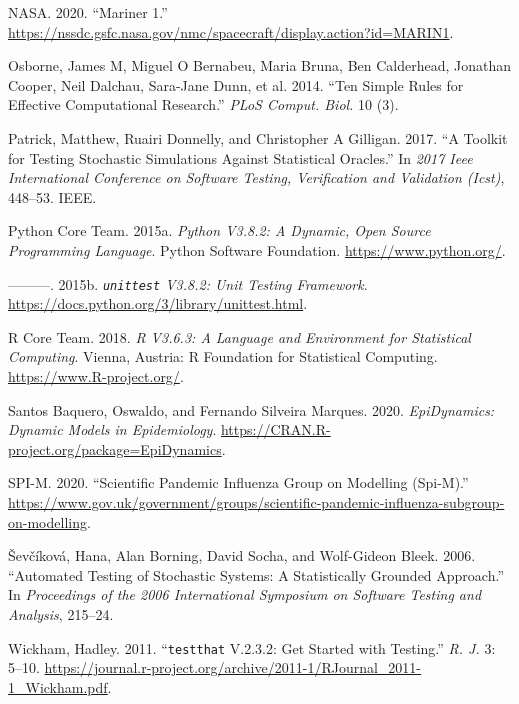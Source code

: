 \documentclass[]{elsarticle} %
\begin{document}
\leavevmode\hypertarget{ref-nasa}{}%
NASA. 2020. ``Mariner 1.'' \url{https://nssdc.gsfc.nasa.gov/nmc/spacecraft/display.action?id=MARIN1}.

\leavevmode\hypertarget{ref-osborne2014ten}{}%
Osborne, James M, Miguel O Bernabeu, Maria Bruna, Ben Calderhead, Jonathan Cooper, Neil Dalchau, Sara-Jane Dunn, et al. 2014. ``Ten Simple Rules for Effective Computational Research.'' \emph{PLoS Comput. Biol.} 10 (3).

\leavevmode\hypertarget{ref-patrick2017toolkit}{}%
Patrick, Matthew, Ruairi Donnelly, and Christopher A Gilligan. 2017. ``A Toolkit for Testing Stochastic Simulations Against Statistical Oracles.'' In \emph{2017 Ieee International Conference on Software Testing, Verification and Validation (Icst)}, 448--53. IEEE.

\leavevmode\hypertarget{ref-python}{}%
Python Core Team. 2015a. \emph{\textup{Python} V3.8.2: A Dynamic, Open Source Programming Language}. Python Software Foundation. \url{https://www.python.org/}.

\leavevmode\hypertarget{ref-pythonunittest}{}%
---------. 2015b. \emph{\texttt{unittest} V3.8.2: Unit Testing Framework}. \url{https://docs.python.org/3/library/unittest.html}.

\leavevmode\hypertarget{ref-R}{}%
R Core Team. 2018. \emph{\textup{R} V3.6.3: A Language and Environment for Statistical Computing}. Vienna, Austria: R Foundation for Statistical Computing. \url{https://www.R-project.org/}.

\leavevmode\hypertarget{ref-santos2015epidynamics}{}%
Santos Baquero, Oswaldo, and Fernando Silveira Marques. 2020. \emph{EpiDynamics: Dynamic Models in Epidemiology}. \url{https://CRAN.R-project.org/package=EpiDynamics}.

\leavevmode\hypertarget{ref-spim}{}%
SPI-M. 2020. ``Scientific Pandemic Influenza Group on Modelling (Spi-M).'' \url{https://www.gov.uk/government/groups/scientific-pandemic-influenza-subgroup-on-modelling}.

\leavevmode\hypertarget{ref-vsevvcikova2006automated}{}%
Ševčíková, Hana, Alan Borning, David Socha, and Wolf-Gideon Bleek. 2006. ``Automated Testing of Stochastic Systems: A Statistically Grounded Approach.'' In \emph{Proceedings of the 2006 International Symposium on Software Testing and Analysis}, 215--24.

\leavevmode\hypertarget{ref-testthat}{}%
Wickham, Hadley. 2011. ``\texttt{testthat} V.2.3.2: Get Started with Testing.'' \emph{R. J.} 3: 5--10. \url{https://journal.r-project.org/archive/2011-1/RJournal_2011-1_Wickham.pdf}.
\end{document}

